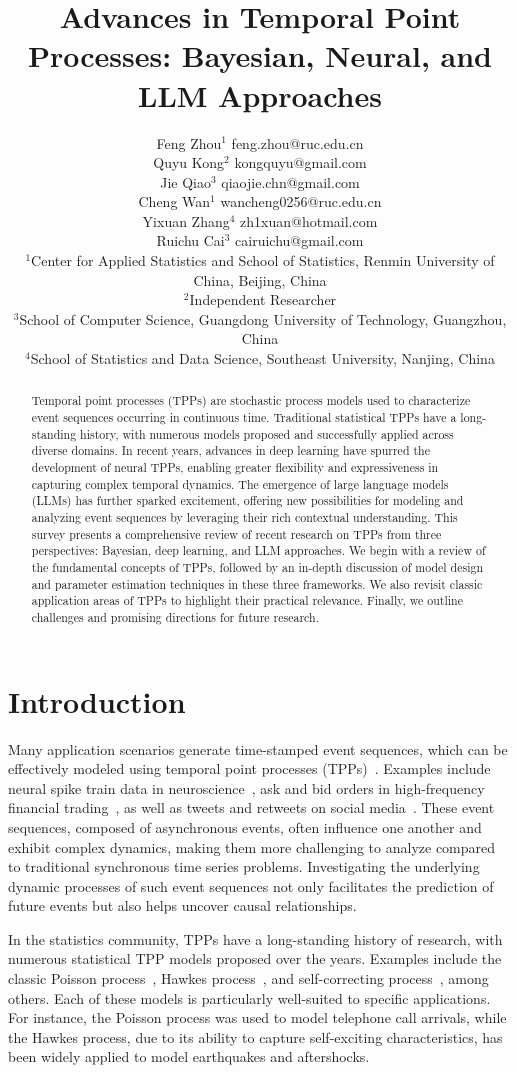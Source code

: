 \documentclass[10pt]{article} %
\title{Advances in Temporal Point Processes: Bayesian, Neural, and LLM Approaches}
\author{\name Feng Zhou$^1$ \email feng.zhou@ruc.edu.cn\\
      \AND
      \name Quyu Kong$^2$ \email kongquyu@gmail.com\\
      \AND
      \name Jie Qiao$^3$ \email qiaojie.chn@gmail.com\\
      \AND
      \name Cheng Wan$^1$ \email wancheng0256@ruc.edu.cn\\
      \AND
      \name Yixuan Zhang$^{4}$ \email zh1xuan@hotmail.com\\
      \AND
      \name Ruichu Cai$^3$ \email cairuichu@gmail.com\\
      \addr $^1$Center for Applied Statistics and School of Statistics, Renmin University of China, Beijing, China\\
  $^2$Independent Researcher\\
  $^3$School of Computer Science, Guangdong University of Technology, Guangzhou, China \\
  $^4$School of Statistics and Data Science, Southeast University, Nanjing, China \\
}
\begin{document}
\maketitle


\begin{abstract}
Temporal point processes (TPPs) are stochastic process models used to characterize event sequences occurring in continuous time. Traditional statistical TPPs have a long-standing history, with numerous models proposed and successfully applied across diverse domains. In recent years, advances in deep learning have spurred the development of neural TPPs, enabling greater flexibility and expressiveness in capturing complex temporal dynamics. The emergence of large language models (LLMs) has further sparked excitement, offering new possibilities for modeling and analyzing event sequences by leveraging their rich contextual understanding. 
This survey presents a comprehensive review of recent research on TPPs from three perspectives: Bayesian, deep learning, and LLM approaches. We begin with a review of the fundamental concepts of TPPs, followed by an in-depth discussion of model design and parameter estimation techniques in these three frameworks. We also revisit classic application areas of TPPs to highlight their practical relevance. Finally, we outline challenges and promising directions for future research. 
\end{abstract}




\section{Introduction}
Many application scenarios generate time-stamped event sequences, which can be effectively modeled using temporal point processes (TPPs)~\citep{daley2007introduction}. Examples include neural spike train data in neuroscience~\citep{linderman2015scalable}, ask and bid orders in high-frequency financial trading~\citep{bacry2014hawkes}, as well as tweets and retweets on social media~\citep{kong2023interval}. These event sequences, composed of asynchronous events, often influence one another and exhibit complex dynamics, making them more challenging to analyze compared to traditional synchronous time series problems. Investigating the underlying dynamic processes of such event sequences not only facilitates the prediction of future events but also helps uncover causal relationships. 


In the statistics community, TPPs have a long-standing history of research, with numerous statistical TPP models proposed over the years. Examples include the classic Poisson process~\citep{kingman1992poisson}, Hawkes process~\citep{hawkes1971spectra}, and self-correcting process~\citep{isham1979self}, among others. Each of these models is particularly well-suited to specific applications. For instance, the Poisson process was used to model telephone call arrivals, while the Hawkes process, due to its ability to capture self-exciting characteristics, has been widely applied to model earthquakes and aftershocks.
\end{document}
